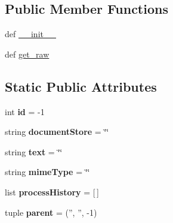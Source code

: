\subsection*{Public Member Functions}
\begin{DoxyCompactItemize}
\item 
def \hyperlink{classcheshire3_1_1base_objects_1_1_document_ab04d5fc31de43a52067436ec27ad29f0}{\-\_\-\-\_\-init\-\_\-\-\_\-}
\item 
def \hyperlink{classcheshire3_1_1base_objects_1_1_document_acdcb8bda07b95c6ae2086a14f6970e19}{get\-\_\-raw}
\end{DoxyCompactItemize}
\subsection*{Static Public Attributes}
\begin{DoxyCompactItemize}
\item 
\hypertarget{classcheshire3_1_1base_objects_1_1_document_ae04055f89a788cac01dc25683c7cd501}{int {\bfseries id} = -\/1}\label{classcheshire3_1_1base_objects_1_1_document_ae04055f89a788cac01dc25683c7cd501}

\item 
\hypertarget{classcheshire3_1_1base_objects_1_1_document_aceb2d61c021095d2b14faf88e8fb3ab8}{string {\bfseries document\-Store} = \char`\"{}\char`\"{}}\label{classcheshire3_1_1base_objects_1_1_document_aceb2d61c021095d2b14faf88e8fb3ab8}

\item 
\hypertarget{classcheshire3_1_1base_objects_1_1_document_a8c787137006e3c94fbe0784a45215524}{string {\bfseries text} = \char`\"{}\char`\"{}}\label{classcheshire3_1_1base_objects_1_1_document_a8c787137006e3c94fbe0784a45215524}

\item 
\hypertarget{classcheshire3_1_1base_objects_1_1_document_a2d0c4d526223641d35275082aa920298}{string {\bfseries mime\-Type} = \char`\"{}\char`\"{}}\label{classcheshire3_1_1base_objects_1_1_document_a2d0c4d526223641d35275082aa920298}

\item 
\hypertarget{classcheshire3_1_1base_objects_1_1_document_af006946479b2305a5027e015f8ffe3e8}{list {\bfseries process\-History} = \mbox{[}$\,$\mbox{]}}\label{classcheshire3_1_1base_objects_1_1_document_af006946479b2305a5027e015f8ffe3e8}

\item 
\hypertarget{classcheshire3_1_1base_objects_1_1_document_a9d6b0d20f87f26b54a3e4c9412f9995e}{tuple {\bfseries parent} = ('', '', -\/1)}\label{classcheshire3_1_1base_objects_1_1_document_a9d6b0d20f87f26b54a3e4c9412f9995e}

\end{DoxyCompactItemize}


